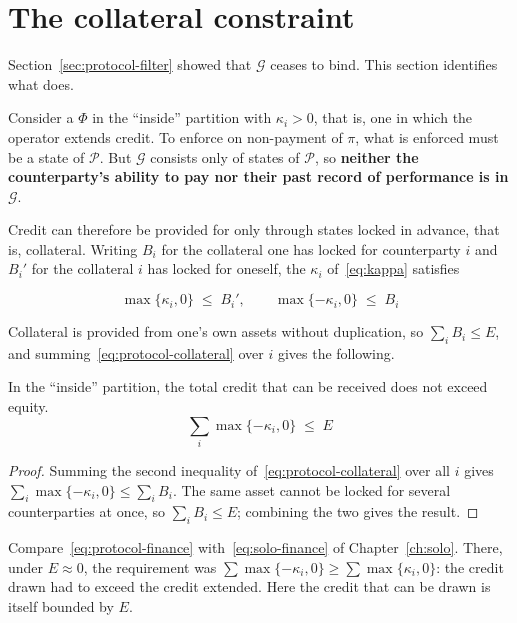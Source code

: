 \section{The collateral constraint}
\label{sec:collateral}

Section~\ref{sec:protocol-filter} showed that $\mathcal{G}$ ceases to bind. This section
identifies what does.

Consider a $\Phi$ in the ``inside'' partition with $\kappa_i>0$, that is, one in which the
operator extends credit. To enforce on non-payment of $\pi$, what is enforced must be a state
of $\mathcal{P}$. But $\mathcal{G}$ consists only of states of $\mathcal{P}$, so
\textbf{neither the counterparty's ability to pay nor their past record of performance is in
$\mathcal{G}$}.

Credit can therefore be provided for only through states locked in advance, that is,
collateral. Writing $B_i$ for the collateral one has locked for counterparty $i$ and $B_i'$
for the collateral $i$ has locked for oneself, the $\kappa_i$ of~\eqref{eq:kappa} satisfies

\begin{equation}
\max\{\kappa_i,0\} \;\leq\; B_i',
\qquad
\max\{-\kappa_i,0\} \;\leq\; B_i
\label{eq:protocol-collateral}
\end{equation}

Collateral is provided from one's own assets without duplication, so $\sum_i B_i\leq E$, and
summing~\eqref{eq:protocol-collateral} over $i$ gives the following.

\begin{proposition}
\label{prop:collateral}
In the ``inside'' partition, the total credit that can be received does not exceed equity.
\begin{equation}
\sum_i \max\{-\kappa_i,0\} \;\leq\; E
\label{eq:protocol-finance}
\end{equation}
\end{proposition}

\begin{proof}
Summing the second inequality of~\eqref{eq:protocol-collateral} over all $i$ gives
$\sum_i\max\{-\kappa_i,0\}\leq\sum_i B_i$. The same asset cannot be locked for several
counterparties at once, so $\sum_i B_i\leq E$; combining the two gives the result.
\end{proof}

Compare~\eqref{eq:protocol-finance} with~\eqref{eq:solo-finance} of Chapter~\ref{ch:solo}.
There, under $E\approx 0$, the requirement was
$\sum\max\{-\kappa_i,0\}\geq\sum\max\{\kappa_i,0\}$: the credit drawn had to exceed the
credit extended. Here the credit that can be drawn is itself bounded by $E$.


